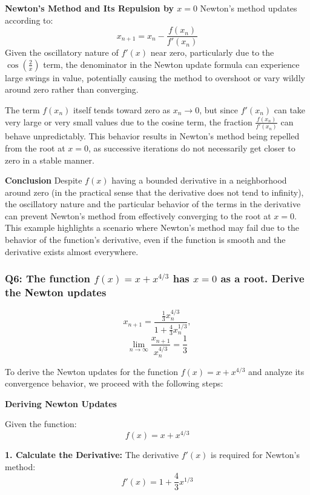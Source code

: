 \documentclass[8pt]{article}
\begin{document}
\textbf{Newton’s Method and Its Repulsion by \(x = 0\)}
Newton's method updates according to:
\[
x_{n+1} = x_n - \frac{f(x_n)}{f'(x_n)}
\]
Given the oscillatory nature of \(f'(x)\) near zero, particularly due to the \(\cos\left(\frac{2}{x}\right)\) term, the denominator in the Newton update formula can experience large swings in value, potentially causing the method to overshoot or vary wildly around zero rather than converging.

The term \(f(x_n)\) itself tends toward zero as \(x_n \to 0\), but since \(f'(x_n)\) can take very large or very small values due to the cosine term, the fraction \(\frac{f(x_n)}{f'(x_n)}\) can behave unpredictably. This behavior results in Newton's method being repelled from the root at \(x = 0\), as successive iterations do not necessarily get closer to zero in a stable manner.

\textbf{Conclusion}
Despite \(f(x)\) having a bounded derivative in a neighborhood around zero (in the practical sense that the derivative does not tend to infinity), the oscillatory nature and the particular behavior of the terms in the derivative can prevent Newton's method from effectively converging to the root at \(x = 0\). This example highlights a scenario where Newton’s method may fail due to the behavior of the function's derivative, even if the function is smooth and the derivative exists almost everywhere.

\subsubsection*{Q6: The function \(f(x) = x + x^{4/3}\) has \(x = 0\) as a root. Derive the Newton updates}
\[ x_{n+1} = \frac{\frac{1}{3} x_n^{4/3}}{1 + \frac{4}{3} x_n^{1/3}}, \]
\[ \lim_{n \to \infty} \frac{x_{n+1}}{x_n^{4/3}} = \frac{1}{3} \]

To derive the Newton updates for the function \(f(x) = x + x^{4/3}\) and analyze its convergence behavior, we proceed with the following steps:

\textbf{Deriving Newton Updates}

Given the function:
\[ f(x) = x + x^{4/3} \]

\textbf{1. Calculate the Derivative: }
   The derivative \(f'(x)\) is required for Newton's method:
   \[
   f'(x) = 1 + \frac{4}{3}x^{1/3}
   \]
\end{document}
